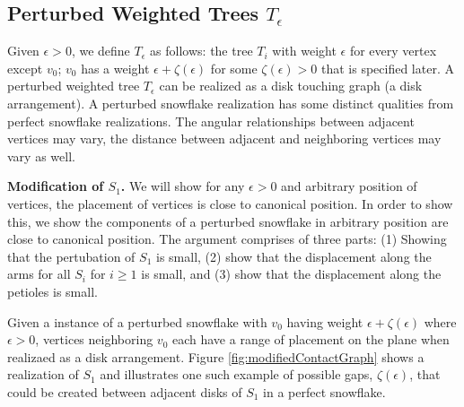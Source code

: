 \subsection{Perturbed Weighted Trees $T_\epsilon$}
Given $\epsilon > 0$, we define $T_\epsilon$ as follows: the tree $T_i$ with weight $\epsilon$ for every vertex except $v_0$; $v_0$ has a weight $\epsilon + \zeta(\epsilon)$ for some $\zeta(\epsilon)>0$ that is specified later.
A perturbed weighted tree $T_\epsilon$ can be realized as a disk touching graph (a disk arrangement).  
A perturbed snowflake realization has some distinct qualities from perfect snowflake realizations.  
The angular relationships between adjacent vertices may vary, the distance between adjacent and neighboring vertices may vary as well.

\textbf{Modification of $S_1$.}
We will show for any $\epsilon >0$ and arbitrary position of vertices, the placement of vertices is close to canonical position.  
In order to show this, we show the components of a perturbed snowflake in arbitrary position  are close to canonical position.  
The argument comprises of three parts: (1) Showing that the pertubation of $S_1$ is small, (2) show that the displacement along the arms for all $S_i$ for $i \geq 1$ is small, and (3) show that the displacement along the petioles is small.  

Given a instance of a perturbed snowflake with $v_0$ having weight $\epsilon + \zeta(\epsilon)$ where $\epsilon > 0$, vertices neighboring $v_0$ each have a range of placement on the plane when realizaed as a disk arrangement. 
Figure \ref{fig:modifiedContactGraph} shows a realization of $S_1$ and illustrates one such example of possible gaps, $\zeta(\epsilon)$, that could be created between adjacent disks of $S_1$ in a perfect snowflake.  
